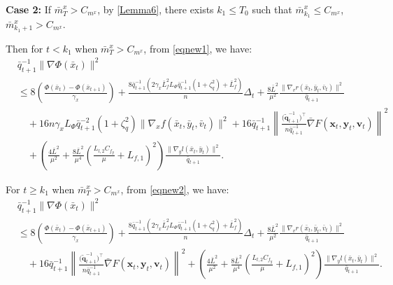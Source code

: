 \documentclass{article}
\theoremstyle{plain}
\theoremstyle{definition}
\theoremstyle{remark}
\begin{document}
\textbf{Case 2:} If $\bar{m}^x_{T} > C_{m^x}$, by \cref{Lemma6}, there exists $k_1 \leq T_0$ such that $\bar{m}^x_{k_1} \leq C_{m^x}$, $\bar{m}^x_{k_1+1} > C_{m^x}$.

Then for $t < k_1$ when $\bar{m}^x_{T} > C_{m^x}$, from \cref{eqnew1}, we have:
\begin{align}
&{\bar{q}_{t+1}^{-1}}\|\nabla \Phi(\bar{x}_t)\|^2\nonumber\\
&\leq8\left(\frac{\Phi(\bar{x}_t)-\Phi(\bar{x}_{t+1})}{\gamma_x}\right)+\frac{8\bar{q}_{t+1}^{-1}(2\gamma_x \bar{L}_{f}^2L_\Phi \bar{q}_{t+1}^{-1} \left(1 +\zeta_q^2\right)+\bar{L}_{f}^2)}{n} \Delta_t+ \frac{8\bar{L}^2 }{\mu^2} \frac{\|\nabla_v r(\bar{x}_t, \bar{y}_t, \bar{v}_t)\|^2}{\bar{q}_{t+1}} \nonumber\\
&\quad +{16n\gamma_x L_\Phi \bar{q}_{t+1}^{-2} \left(1 +\zeta_q^2\right)}{\|\nabla_x f(\bar{x}_t, \bar{y}_t, \bar{v}_t)\|^2}
+ 16 \bar{q}_{t+1}^{-1}  \left\| \frac{\big(\tilde{\mathbf{q}}_{t+1}^{-1}\big)^\top}{n\bar{q}_{t+1}^{-1}} \bar{\nabla} F(\mathbf{x}_t, \mathbf{y}_t, \mathbf{v}_t) \right\|^2 \nonumber \\
&\quad +\left( \frac{4\bar{L}^2}{\mu^2} + \frac{8\bar{L}^2}{\mu^4} \left( \frac{L_{l,2} C_{f_y}}{\mu} + L_{f,1} \right)^2 \right) \frac{\|\nabla_y l(\bar{x}_t, \bar{y}_t)\|^2}{\bar{q}_{t+1}}.\label{eq140}
\end{align}

For $t \geq k_1$ when $\bar{m}^x_{T} > C_{m^x}$, from \cref{eqnew2}, we have:
\begin{align}
&{\bar{q}_{t+1}^{-1}}\|\nabla \Phi(\bar{x}_t)\|^2\nonumber\\
&\leq8\left(\frac{\Phi(\bar{x}_t)-\Phi(\bar{x}_{t+1})}{\gamma_x}\right)+\frac{8\bar{q}_{t+1}^{-1}(2\gamma_x \bar{L}_{f}^2L_\Phi \bar{q}_{t+1}^{-1} \left(1 +\zeta_q^2\right)+\bar{L}_{f}^2)}{n} \Delta_t+ \frac{8\bar{L}^2 }{\mu^2} \frac{\|\nabla_v r(\bar{x}_t, \bar{y}_t, \bar{v}_t)\|^2}{\bar{q}_{t+1}} \nonumber\\
&\quad + 16 \bar{q}_{t+1}^{-1}  \left\| \frac{\big(\tilde{\mathbf{q}}_{t+1}^{-1}\big)^\top}{n\bar{q}_{t+1}^{-1}} \bar{\nabla} F(\mathbf{x}_t, \mathbf{y}_t, \mathbf{v}_t) \right\|^2  +\left( \frac{4\bar{L}^2}{\mu^2} + \frac{8\bar{L}^2}{\mu^4} \left( \frac{L_{l,2} C_{f_y}}{\mu} + L_{f,1} \right)^2 \right) \frac{\|\nabla_y l(\bar{x}_t, \bar{y}_t)\|^2}{\bar{q}_{t+1}}.\label{eq141}
\end{align}
\end{document}
